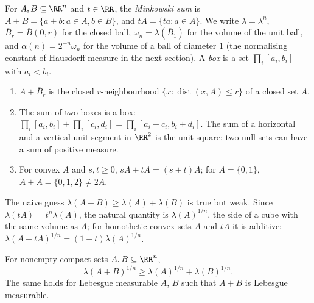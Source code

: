 \begin{notation}\label{geometric-measure-theory:notation-minkowski-sum}
For $A, B \subseteq \RR^n$ and $t \in \RR$, the \emph{Minkowski sum} is $A + B = \{a + b : a \in A, b \in B\}$, and $tA = \{ta : a \in A\}$. We write $\lambda = \lambda^n$, $\overline{B}_r = \overline{B}(0, r)$
for the closed ball, $\omega_n = \lambda(\overline{B}_1)$ for the volume of the unit ball, and $\alpha(n) = 2^{-n}\omega_n$ for the volume of a ball of diameter $1$ (the
normalising constant of Hausdorff measure in the next section). A \emph{box} is a set $\prod_i[a_i, b_i]$ with $a_i < b_i$.
\end{notation}

\begin{example}\label{geometric-measure-theory:example-minkowski-sum}
\begin{enumerate}
\item $A + \overline{B}_r$ is the closed $r$-neighbourhood $\{x : \operatorname{dist}(x, A) \leq r\}$ of a closed set $A$.
\item The sum of two boxes is a box: $\prod_i[a_i, b_i] + \prod_i[c_i, d_i] = \prod_i[a_i + c_i, b_i + d_i]$. The sum of a horizontal and a vertical unit segment in $\RR^2$ is the unit square: two null sets
can have a sum of positive measure.
\item For convex $A$ and $s, t \geq 0$, $sA + tA = (s + t)A$; for $A = \{0, 1\}$, $A + A = \{0, 1, 2\} \neq 2A$.
\end{enumerate}
\end{example}

The naive guess $\lambda(A + B) \geq \lambda(A) + \lambda(B)$ is true but weak. Since $\lambda(tA) = t^n\lambda(A)$, the natural quantity is $\lambda(A)^{1/n}$, the side of a cube with the same volume as $A$; for
homothetic convex sets $A$ and $tA$ it is additive: $\lambda(A + tA)^{1/n} = (1 + t)\lambda(A)^{1/n}$.

\begin{theorem}\label{geometric-measure-theory:theorem-brunn-minkowski}
For nonempty compact sets $A, B \subseteq \RR^n$,
\begin{equation}\label{geometric-measure-theory:equation-brunn-minkowski}
\lambda(A + B)^{1/n} \geq \lambda(A)^{1/n} + \lambda(B)^{1/n}.
\end{equation}
The same holds for Lebesgue measurable $A$, $B$ such that $A + B$ is Lebesgue measurable.
\end{theorem}


